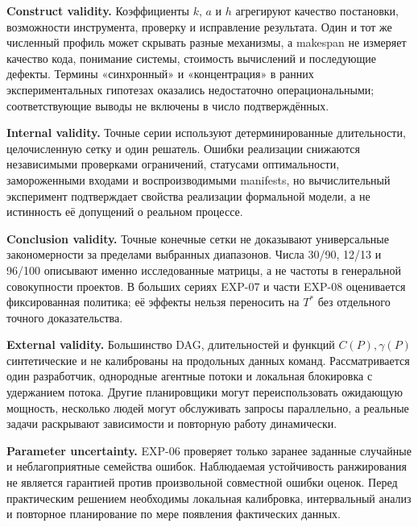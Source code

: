 \textbf{Construct validity.}
Коэффициенты $k$, $a$ и $h$ агрегируют качество постановки, возможности
инструмента, проверку и исправление результата. Один и тот же численный профиль
может скрывать разные механизмы, а makespan не измеряет качество кода,
понимание системы, стоимость вычислений и последующие дефекты. Термины
«синхронный» и «концентрация» в ранних экспериментальных гипотезах оказались
недостаточно операциональными; соответствующие выводы не включены в число
подтверждённых.

\textbf{Internal validity.}
Точные серии используют детерминированные длительности, целочисленную сетку и
один решатель. Ошибки реализации снижаются независимыми проверками ограничений,
статусами оптимальности, замороженными входами и воспроизводимыми manifests,
но вычислительный эксперимент подтверждает свойства реализации формальной
модели, а не истинность её допущений о реальном процессе.

\textbf{Conclusion validity.}
Точные конечные сетки не доказывают универсальные закономерности за пределами
выбранных диапазонов. Числа 30/90, 12/13 и 96/100 описывают именно исследованные
матрицы, а не частоты в генеральной совокупности проектов. В больших сериях
EXP-07 и части EXP-08 оценивается фиксированная политика; её эффекты нельзя
переносить на $T^*$ без отдельного точного доказательства.

\textbf{External validity.}
Большинство DAG, длительностей и функций $C(P),\gamma(P)$ синтетические и не
калиброваны на продольных данных команд. Рассматривается один разработчик,
однородные агентные потоки и локальная блокировка с удержанием потока. Другие
планировщики могут переиспользовать ожидающую мощность, несколько людей могут
обслуживать запросы параллельно, а реальные задачи раскрывают зависимости и
повторную работу динамически.

\textbf{Parameter uncertainty.}
EXP-06 проверяет только заранее заданные случайные и неблагоприятные семейства
ошибок. Наблюдаемая устойчивость ранжирования не является гарантией против
произвольной совместной ошибки оценок. Перед практическим решением необходимы
локальная калибровка, интервальный анализ и повторное планирование по мере
появления фактических данных.
